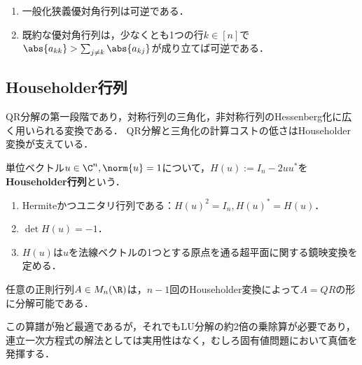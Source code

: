 \documentclass[uplatex, dvipdfmx]{jsreport}
\begin{document}
\begin{proposition}\mbox{}
    \begin{enumerate}
        \item 一般化狭義優対角行列は可逆である．
        \item 既約な優対角行列は，少なくとも1つの行$k\in[n]$で$\abs{a_{kk}}>\sum_{j\ne k}\abs{a_{kj}}$が成り立てば可逆である．
    \end{enumerate}
\end{proposition}

\subsection{Householder行列}

\begin{tcolorbox}[colframe=ForestGreen, colback=ForestGreen!10!white,breakable,colbacktitle=ForestGreen!40!white,coltitle=black,fonttitle=\bfseries\sffamily,
title=]
    QR分解の第一段階であり，対称行列の三角化，非対称行列のHessenberg化に広く用いられる変換である．
    QR分解と三角化の計算コストの低さはHouseholder変換が支えている．
\end{tcolorbox}

\begin{definition}
    単位ベクトル$u\in\C^n,\norm{u}=1$について，$H(u):=I_n-2uu^*$を\textbf{Householder行列}という．
\end{definition}

\begin{proposition}\mbox{}
    \begin{enumerate}
        \item Hermiteかつユニタリ行列である：$H(u)^2=I_n,H(u)^*=H(u)$．
        \item $\det H(u)=-1$．
        \item $H(u)$は$u$を法線ベクトルの1つとする原点を通る超平面に関する鏡映変換を定める．
    \end{enumerate}
\end{proposition}

\begin{theorem}
    任意の正則行列$A\in M_n(\R)$は，$n-1$回のHouseholder変換によって$A=QR$の形に分解可能である．
\end{theorem}
\begin{remarks}
    この算譜が殆ど最適であるが，それでもLU分解の約2倍の乗除算が必要であり，連立一次方程式の解法としては実用性はなく，むしろ固有値問題において真価を発揮する．
\end{remarks}
\end{document}
